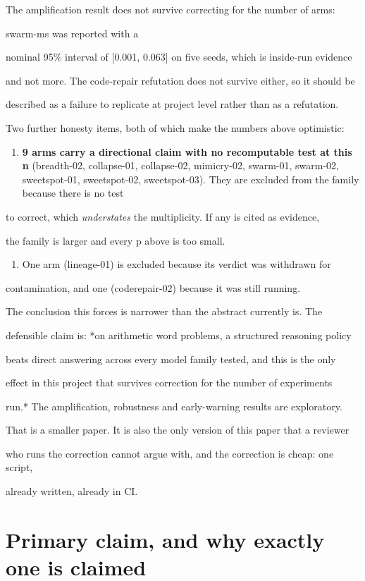 \documentclass[11pt]{article}
\begin{document}
The amplification result does not survive correcting for the number of arms:

swarm-ms was reported with a

nominal 95\% interval of [0.001, 0.063] on five seeds, which is inside-run evidence

and not more. The code-repair refutation does not survive either, so it should be

described as a failure to replicate at project level rather than as a refutation.


Two further honesty items, both of which make the numbers above optimistic:


\begin{enumerate}\item {\bf 9 arms carry a directional claim with no recomputable test at this n} (breadth-02, collapse-01, collapse-02, mimicry-02, swarm-01, swarm-02, sweetspot-01, sweetspot-02, sweetspot-03). They are excluded from the family because there is no test
\end{enumerate}
to correct, which {\it understates} the multiplicity. If any is cited as evidence,

the family is larger and every p above is too small.

\begin{enumerate}\item One arm (lineage-01) is excluded because its verdict was withdrawn for
\end{enumerate}
contamination, and one (coderepair-02) because it was still running.


The conclusion this forces is narrower than the abstract currently is. The

defensible claim is: *on arithmetic word problems, a structured reasoning policy

beats direct answering across every model family tested, and this is the only

effect in this project that survives correction for the number of experiments

run.* The amplification, robustness and early-warning results are exploratory.


That is a smaller paper. It is also the only version of this paper that a reviewer

who runs the correction cannot argue with, and the correction is cheap: one script,

already written, already in CI.


\section*{Primary claim, and why exactly one is claimed}
\end{document}
